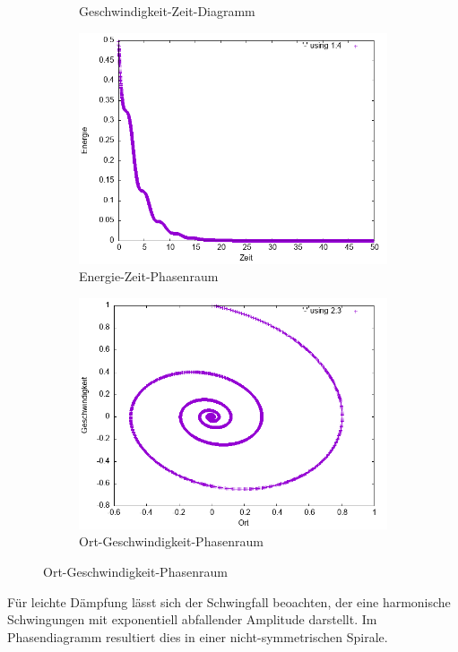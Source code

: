\documentclass[
    oneside,
    ngerman,
    footinclude=false,
    captions=tableheading,
    DIV=12
]{scrartcl}
\begin{document}
\begin{figure}[H]
\begin{subfigure}[b]{0.45\textwidth}
                        \caption{Geschwindigkeit-Zeit-Diagramm}
                        \label{fig:VVA1(a)-001-0.3-v}
                    \end{subfigure}
                    \hfill
                    \begin{subfigure}[b]{0.45\textwidth}
                        \centering
                        \includegraphics[width=\textwidth]{Bilddateien/VVA1(b)-001-0.3-E.png}
                        \caption{Energie-Zeit-Phasenraum}
                        \label{fig:VVA1(a)-001-0.3-E}
                    \end{subfigure}
                    \begin{subfigure}[b]{0.45\textwidth}
                        \centering
                        \includegraphics[width=\textwidth]{Bilddateien/VVA1(b)-001-0.3-xv.png}
                        \caption{Ort-Geschwindigkeit-Phasenraum}
                        \label{fig:VVA1(a)-001-0.3-xv}
                    \end{subfigure}
                \end{figure}
                Für leichte Dämpfung lässt sich der Schwingfall beoachten, der eine harmonische Schwingungen mit exponentiell abfallender Amplitude darstellt. Im Phasendiagramm resultiert dies in einer nicht-symmetrischen Spirale.
\end{document}
